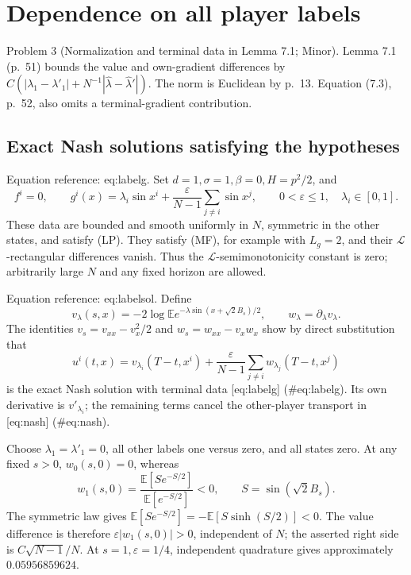 \documentclass[10pt]{article}
\begin{document}
\section*{Dependence on all player labels}
Problem 3 (Normalization and terminal data in Lemma 7.1; Minor).  Lemma 7.1 (p. 51) bounds the value and own-gradient differences by \(C(|\lambda_1-\lambda'_1|+N^{-1}|\widehat\lambda-\widehat\lambda'|)\). The norm is Euclidean by p. 13. Equation (7.3), p. 52, also omits a terminal-gradient contribution.\par
\subsection*{Exact Nash solutions satisfying the hypotheses}
Equation reference: eq:labelg. Set \(d=1,\sigma=1,\beta=0,H=p^2/2\), and \[
f^i=0,\qquad
g^i(x)=\lambda_i\sin x^i+\frac{\varepsilon}{N-1}\sum_{j\ne i}\sin x^j,
\qquad 0<\varepsilon\le1,\quad\lambda_i\in[0,1].\] These data are bounded and smooth uniformly in \(N\), symmetric in the other states, and satisfy (LP). They satisfy (MF), for example with \(L_g=2\), and their \(\mathcal L\)-rectangular differences vanish. Thus the \(\mathcal L\)-semimonotonicity constant is zero; arbitrarily large \(N\) and any fixed horizon are allowed.\par
Equation reference: eq:labelsol. Define \[v_\lambda(s,x)=-2\log\mathbb Ee^{-\lambda\sin(x+\sqrt2B_s)/2},
\qquad w_\lambda=\partial_\lambda v_\lambda.\] The identities \(v_s=v_{xx}-v_x^2/2\) and \(w_s=w_{xx}-v_xw_x\) show by direct substitution that \[
u^i(t,x)=v_{\lambda_i}(T-t,x^i)
+\frac{\varepsilon}{N-1}\sum_{j\ne i}w_{\lambda_j}(T-t,x^j)\] is the exact Nash solution with terminal data [eq:labelg] (\#eq:labelg). Its own derivative is \(v'_{\lambda_i}\); the remaining terms cancel the other-player transport in [eq:nash] (\#eq:nash).\par
Choose \(\lambda_1=\lambda'_1=0\), all other labels one versus zero, and all states zero. At any fixed \(s>0\), \(w_0(s,0)=0\), whereas \[w_1(s,0)=\frac{\mathbb E[S e^{-S/2}]}{\mathbb E[e^{-S/2}]}<0,
\qquad S=\sin(\sqrt2 B_s).\] The symmetric law gives \(\mathbb E[S e^{-S/2}]=-\mathbb E[S\sinh(S/2)]<0\). The value difference is therefore \(\varepsilon|w_1(s,0)|>0\), independent of \(N\); the asserted right side is \(C\sqrt{N-1}/N\). At \(s=1,\varepsilon=1/4\), independent quadrature gives approximately \(0.05956859624\).\par
\end{document}
